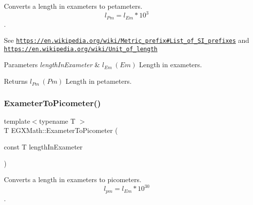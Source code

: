 Converts a length in exameters to petameters. \[ l_{Pm}=l_{Em} * 10^{3} \]. 

See \href{https://en.wikipedia.org/wiki/Metric_prefix#List_of_SI_prefixes}{\tt https\+://en.\+wikipedia.\+org/wiki/\+Metric\+\_\+prefix\#\+List\+\_\+of\+\_\+\+S\+I\+\_\+prefixes} and \href{https://en.wikipedia.org/wiki/Unit_of_length}{\tt https\+://en.\+wikipedia.\+org/wiki/\+Unit\+\_\+of\+\_\+length} 
\begin{DoxyParams}{Parameters}
{\em length\+In\+Exameter} & $ l_{Em}\ (Em)$ Length in exameters. \\
\hline
\end{DoxyParams}
\begin{DoxyReturn}{Returns}
$ l_{Pm}\ (Pm)$ Length in petameters. 
\end{DoxyReturn}
\mbox{\label{group___e_g_x_math-_conversions-_length_conversions-_s_i-_exameter-_s_i_gaf524e8324fedf2eb61d43ce1dc36bcac}} 
\subsubsection{\texorpdfstring{Exameter\+To\+Picometer()}{ExameterToPicometer()}}
{\footnotesize\ttfamily template$<$typename T $>$ \\
T E\+G\+X\+Math\+::\+Exameter\+To\+Picometer (\begin{DoxyParamCaption}\item[{const T}]{length\+In\+Exameter }\end{DoxyParamCaption})}



Converts a length in exameters to picometers. \[ l_{pm}=l_{Em} * 10^{30} \]. 


